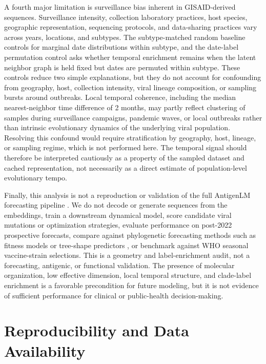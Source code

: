 \documentclass[11pt]{article}
\begin{document}
A fourth major limitation is surveillance bias inherent in GISAID-derived sequences. Surveillance intensity, collection laboratory practices, host species, geographic representation, sequencing protocols, and data-sharing practices vary across years, locations, and subtypes. The subtype-matched random baseline controls for marginal date distributions within subtype, and the date-label permutation control asks whether temporal enrichment remains when the latent neighbor graph is held fixed but dates are permuted within subtype. These controls reduce two simple explanations, but they do not account for confounding from geography, host, collection intensity, viral lineage composition, or sampling bursts around outbreaks. Local temporal coherence, including the median nearest-neighbor time difference of 2 months, may partly reflect clustering of samples during surveillance campaigns, pandemic waves, or local outbreaks rather than intrinsic evolutionary dynamics of the underlying viral population. Resolving this confound would require stratification by geography, host, lineage, or sampling regime, which is not performed here. The temporal signal should therefore be interpreted cautiously as a property of the sampled dataset and cached representation, not necessarily as a direct estimate of population-level evolutionary tempo.

Finally, this analysis is not a reproduction or validation of the full AntigenLM forecasting pipeline \cite{pei2026antigenlm}. We do not decode or generate sequences from the embeddings, train a downstream dynamical model, score candidate viral mutations or optimization strategies, evaluate performance on post-2022 prospective forecasts, compare against phylogenetic forecasting methods such as fitness models or tree-shape predictors \cite{luksza2014fitness,neher2014predicting}, or benchmark against WHO seasonal vaccine-strain selections. This is a geometry and label-enrichment audit, not a forecasting, antigenic, or functional validation. The presence of molecular organization, low effective dimension, local temporal structure, and clade-label enrichment is a favorable precondition for future modeling, but it is not evidence of sufficient performance for clinical or public-health decision-making.

\section{Reproducibility and Data Availability}
\end{document}
